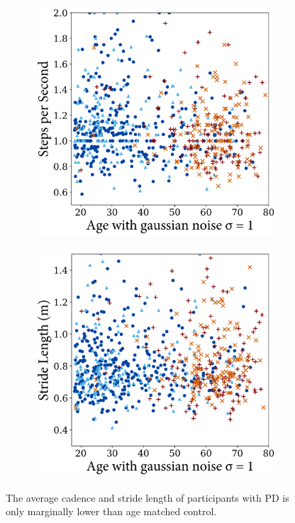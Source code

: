 \documentclass[12pt, twoside]{book}
\begin{document}
\begin{figure}[h]
	\centering
	\begin{subfigure}{.42\textwidth}
		\centering
		\includegraphics[width=0.96\linewidth]{stepspermin.png}
	\end{subfigure}%
	\begin{subfigure}{.42\textwidth}
		\centering
		\includegraphics[width=0.96\linewidth]{stridelength.png}
	\end{subfigure}
	\caption{The average cadence and stride length of participants with PD is only marginally lower than age matched control.}
	\label{basicwalkvis}
\end{figure}
\end{document}
